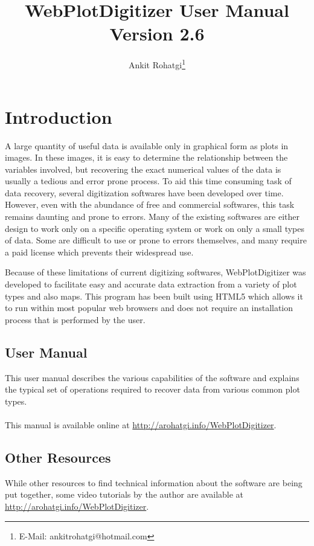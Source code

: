 \documentclass{article}
\begin{document}
\title{WebPlotDigitizer User Manual\\ Version 2.6}
\author{Ankit Rohatgi\footnote{E-Mail: ankitrohatgi@hotmail.com}}
\maketitle
\tableofcontents
\newpage
\section{Introduction}
A large quantity of useful data is available only in graphical form as plots in images. In these images, it is easy to determine the relationship between the variables involved, but recovering the exact numerical values of the data is usually a tedious and error prone process. To aid this time consuming task of data recovery, several digitization softwares have been developed over time. However, even with the abundance of free and commercial softwares, this task remains daunting and prone to errors. Many of the existing softwares are either design to work only on a specific operating system or work on only a small types of data. Some are difficult to use or prone to errors themselves, and many require a paid license which prevents their widespread use.

Because of these limitations of current digitizing softwares, WebPlotDigitizer was developed to facilitate easy and accurate data extraction from a variety of plot types and also maps. This program has been built using HTML5 which allows it to run within most popular web browsers and does not require an installation process that is performed by the user.

\subsection{User Manual}
This user manual describes the various capabilities of the software and explains the typical set of operations required to recover data from various common plot types. 
\\
\\
This manual is available online at \url{http://arohatgi.info/WebPlotDigitizer}.

\subsection{Other Resources}
While other resources to find technical information about the software are being put together, some video tutorials by the author are available at \url{http://arohatgi.info/WebPlotDigitizer}.
\end{document}
